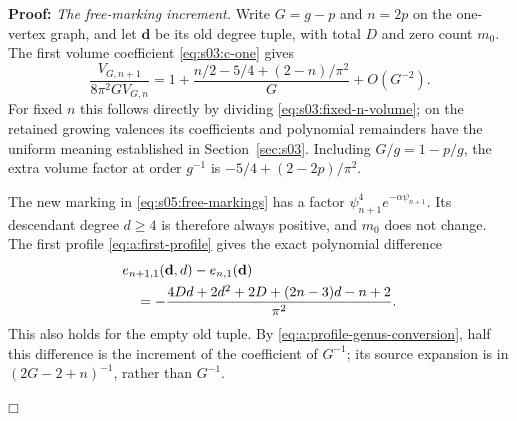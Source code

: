 \documentclass[a4paper,10pt]{article}
\numberwithin{equation}{section}
\theoremstyle{paperplain}
\theoremstyle{paperremark}
\theoremstyle{paperplain}
\newenvironment{prf}{\noindent \textbf{Proof: }}{\hfill $\mdlgwhtsquare$\par\addvspace{0.5\baselineskip}}
\begin{document}
\begin{prf}
\emph{The free-marking increment.}
Write $G=g-p$ and $n=2p$ on the one-vertex graph, and let
$\mathbf d$ be its old degree tuple, with total $D$ and zero count
$m_0$. The first volume coefficient \eqref{eq:s03:c-one} gives
\begin{equation}\label{eq:s05:one-mark-volume}
 \frac{V_{G,n+1}}{8\pi^2G V_{G,n}}
 =1+\frac{n/2-5/4+(2-n)/\pi^2}{G}+O(G^{-2}).
\end{equation}
For fixed $n$ this follows directly by dividing
\eqref{eq:s03:fixed-n-volume}; on the retained growing valences its
coefficients and polynomial remainders have the uniform meaning
established in Section~\ref{sec:s03}. Including $G/g=1-p/g$, the
extra volume factor at order $g^{-1}$ is
$-5/4+(2-2p)/\pi^2$.

The new marking in \eqref{eq:s05:free-markings} has a factor
$\psi_{n+1}^4e^{-\alpha\psi_{n+1}}$. Its descendant degree
$d\geq4$ is therefore always positive, and $m_0$ does not change.
The first profile \eqref{eq:a:first-profile} gives the exact
polynomial difference
\begin{align}
 &e_{n+1,1}(\mathbf d,d)-e_{n,1}(\mathbf d)\notag\\
 &\quad=-\frac{4Dd+2d^2+2D+(2n-3)d-n+2}{\pi^2}.
 \label{eq:s05:profile-increment}
\end{align}
This also holds for the empty old tuple. By
\eqref{eq:a:profile-genus-conversion}, half this difference is the
increment of the coefficient of $G^{-1}$; its source expansion is
in $(2G-2+n)^{-1}$, rather than $G^{-1}$.


\end{prf}
\end{document}

